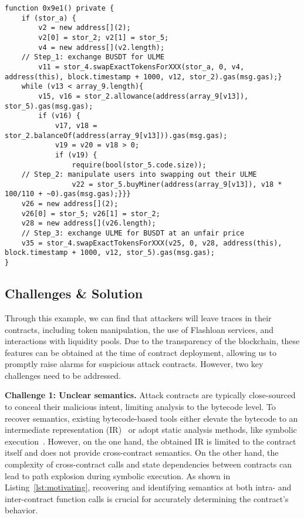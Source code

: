 \begin{lstlisting}[caption={Attack contract against \textit{ULME}.}, label=lst:motivating]
function 0x9e1() private {
    if (stor_a) {
        v2 = new address[](2);
        v2[0] = stor_2; v2[1] = stor_5;
        v4 = new address[](v2.length);
    // Step_1: exchange BUSDT for ULME
        v11 = stor_4.swapExactTokensForXXX(stor_a, 0, v4, address(this), block.timestamp + 1000, v12, stor_2).gas(msg.gas);}
    while (v13 < array_9.length){
        v15, v16 = stor_2.allowance(address(array_9[v13]), stor_5).gas(msg.gas);
        if (v16) {
            v17, v18 = stor_2.balanceOf(address(array_9[v13])).gas(msg.gas);
            v19 = v20 = v18 > 0;
            if (v19) {
                require(bool(stor_5.code.size));
    // Step_2: manipulate users into swapping out their ULME
                v22 = stor_5.buyMiner(address(array_9[v13]), v18 * 100/110 + ~0).gas(msg.gas);}}}
    v26 = new address[](2);
    v26[0] = stor_5; v26[1] = stor_2;
    v28 = new address[](v26.length);
    // Step_3: exchange ULME for BUSDT at an unfair price
    v35 = stor_4.swapExactTokensForXXX(v25, 0, v28, address(this), block.timestamp + 1000, v12, stor_5).gas(msg.gas);
}
\end{lstlisting}


\subsection{Challenges \& Solution}
Through this example, we can find that attackers will leave traces in their contracts, including token manipulation, the use of Flashloan services, and interactions with liquidity pools. Due to the transparency of the blockchain, these features can be obtained at the time of contract deployment, allowing us to promptly raise alarms for suspicious attack contracts.
However, two key challenges need to be addressed.

\noindent
\textbf{Challenge 1: Unclear semantics.}
Attack contracts are typically close-sourced to conceal their malicious intent, limiting analysis to the bytecode level. To recover semantics, existing bytecode-based tools either elevate the bytecode to an intermediate representation (IR)~\cite{grech2019gigahorse} or adopt static analysis methods, like symbolic execution~\cite{mythril}.
However, on the one hand, the obtained IR is limited to the contract itself and does not provide cross-contract semantics. On the other hand, the complexity of cross-contract calls and state dependencies between contracts can lead to path explosion during symbolic execution.
As shown in Listing~\ref{lst:motivating}, recovering and identifying semantics at both intra- and inter-contract function calls is crucial for accurately determining the contract's behavior.



